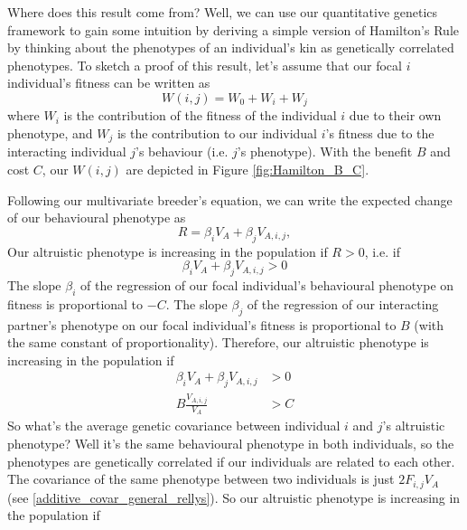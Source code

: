 Where does this result come from? Well, we can use our quantitative genetics framework to gain some 
intuition by deriving a simple version of Hamilton's Rule by thinking
about the phenotypes of an individual's kin as genetically correlated
phenotypes. To sketch a proof of this result, let's assume that our focal $i$ individual's fitness can be written as 
\begin{equation}
W(i,j)= W_0 + W_i +W_j
\end{equation}
where $W_i$ is the contribution of the fitness of the individual $i$ due
to their own phenotype, and $W_j$ is the contribution to our
individual $i$'s fitness due to the interacting individual $j$'s behaviour (i.e. $j$'s phenotype).
With the benefit $B$ and cost $C$, our $W(i,j)$ are depicted in Figure \ref{fig:Hamilton_B_C}. 

Following our multivariate breeder's equation, we can write the expected change of our behavioural phenotype as 
\begin{equation}
R = \beta_i V_A + \beta_j V_{A,i,j},
\end{equation}
Our altruistic phenotype is increasing in the population if $R>0$, i.e. if 
\begin{equation}
  \beta_i V_A + \beta_j V_{A,i,j}  > 0 \end{equation}
 The slope $\beta_i$ of the regression of our focal individual's
behavioural phenotype on fitness is proportional to $-C$. The slope
$\beta_j$ of the regression of our interacting partner's phenotype on
our focal individual's fitness is proportional to $B$ (with the same
constant of proportionality). Therefore, our altruistic phenotype is increasing in the population if
\begin{eqnarray}
  \beta_i V_A + \beta_j V_{A,i,j} & > 0  \nonumber  \\
 B \frac{V_{A,i,j}}{V_A} & >  C  \label{eqn:Covar_Hamilton}
\end{eqnarray}
So what's the average genetic covariance between
individual $i$ and $j$'s altruistic phenotype? Well it's the same
behavioural phenotype in both individuals, so the phenotypes are
genetically correlated if our individuals are related to each
other. The covariance of the same phenotype between two individuals is
just $2 F_{i,j} V_A$ (see \eqref{additive_covar_general_rellys}). So
our altruistic phenotype is increasing in the population if



